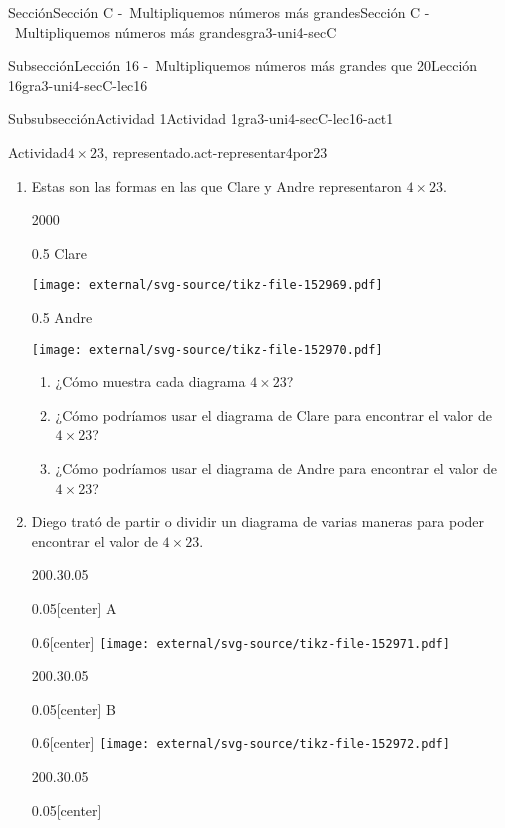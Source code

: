 \documentclass[twoside,14pt,]{extarticle}
\begin{document}
\begin{sectionptx}{Sección}{Sección C -~Multipliquemos números más grandes}{}{Sección C -~Multipliquemos números más grandes}{}{}{gra3-uni4-secC}
\begin{subsectionptx}{Subsección}{Lección 16 -~Multipliquemos números más grandes que 20}{}{Lección 16}{}{}{gra3-uni4-secC-lec16}
\begin{subsubsectionptx}{Subsubsección}{Actividad 1}{}{Actividad 1}{}{}{gra3-uni4-secC-lec16-act1}
\begin{activity}{Actividad}{\(4\times 23\), representado.}{act-representar4por23}
%
\begin{enumerate}
\item{}Estas son las formas en las que Clare y Andre representaron \(4\times 23\).%
\begin{sidebyside}{2}{0}{0}{0}%
\begin{sbspanel}{0.5}%
Clare%
\par
\texttt{[image: external/svg-source/tikz-file-152969.pdf]}
\end{sbspanel}%
\begin{sbspanel}{0.5}%
Andre%
\par
\texttt{[image: external/svg-source/tikz-file-152970.pdf]}
\end{sbspanel}%
\end{sidebyside}%
%
\begin{enumerate}
\item{}¿Cómo muestra cada diagrama \(4\times 23\)?%
\item{}¿Cómo podríamos usar el diagrama de Clare para encontrar el valor de \(4\times 23\)?%
\item{}¿Cómo podríamos usar el diagrama de Andre para encontrar el valor de \(4\times 23\)?%
\end{enumerate}
\pagebreak
\item{}Diego trató de partir o dividir un diagrama de varias maneras para poder encontrar el valor de \(4\times 23\).%
\begin{sidebyside}{2}{0}{0.3}{0.05}%
\begin{sbspanel}{0.05}[center]%
A%
\end{sbspanel}%
\begin{sbspanel}{0.6}[center]%
\texttt{[image: external/svg-source/tikz-file-152971.pdf]}
\end{sbspanel}%
\end{sidebyside}%
\begin{sidebyside}{2}{0}{0.3}{0.05}%
\begin{sbspanel}{0.05}[center]%
B%
\end{sbspanel}%
\begin{sbspanel}{0.6}[center]%
\texttt{[image: external/svg-source/tikz-file-152972.pdf]}
\end{sbspanel}%
\end{sidebyside}%
\begin{sidebyside}{2}{0}{0.3}{0.05}%
\begin{sbspanel}{0.05}[center]%

\end{sbspanel}
\end{sidebyside}
\end{enumerate}
\end{activity}
\end{subsubsectionptx}
\end{subsectionptx}
\end{sectionptx}
\end{document}
